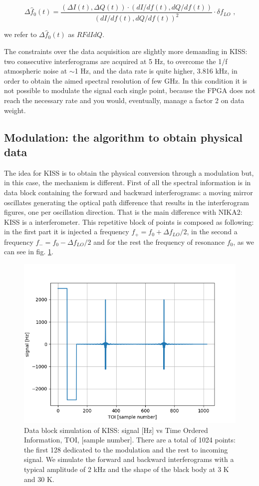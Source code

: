 \begin{equation}
\Delta \hat{f}_0 (t) = \frac{(\Delta I(t), \Delta Q(t))\cdot (dI/df(t),dQ/df(t)  ) }{ ( dI/df(t), dQ/df(t) )^2 }\cdot\delta f_{LO} \text{ ,}
\end{equation}

\noindent we refer to $\Delta \hat{f}_0 (t)$ as $RFdIdQ$.

The constraints over the data acquisition are slightly more demanding in KISS: two consecutive interferograms are acquired at 5 Hz, to overcome the 1/f atmospheric noise at $\sim$1 Hz, and the data rate is quite higher, 3.816 kHz, in order to obtain the aimed spectral resolution of few GHz. In this condition it is not possible to modulate the signal each single point, because the FPGA does not reach the necessary rate and you would, eventually, manage a factor 2 on data weight.

\subsection{Modulation: the algorithm to obtain physical data}
\label{sebsec:alg}

The idea for KISS is to obtain the physical conversion through a modulation but, in this case, the mechanism is different. First of all the spectral information is in data block containing the forward and backward interferograms: a moving mirror oscillates generating the optical path difference that results in the interferogram figures, one per oscillation direction. That is the main difference with NIKA2: KISS is a interferometer. This repetitive block of points is composed as following: in the first part it is injected a frequency $f_+ = f_0 + \Delta f_{LO}/2$, in the second a frequency $f_- = f_0 - \Delta f_{LO}/2$ and for the rest the frequency of resonance $f_0$, as we can see in fig. \ref{fig:mod}.

\begin{figure}[htf]
	\centering
	\includegraphics[width=.5\textwidth]{3.acqui/block_data.png}
	\caption{Data block simulation of KISS: signal [Hz] vs Time Ordered Information, TOI, [sample number]. There are a total of 1024 points: the first 128 dedicated to the modulation and the rest to incoming signal. We simulate the forward and backward interferograms with a typical amplitude of 2 kHz and the shape of the black body at 3 K and 30 K.}
	\label{fig:mod}
\end{figure}

